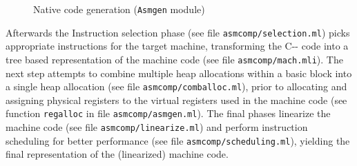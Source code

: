 \documentclass[10pt,a4paper,final,twocolumn]{article}
\begin{document}
\begin{figure}[htb]
  \centering
  \caption{Native code generation (\texttt{Asmgen} module)}
  \label{fig:Native_code_generation}
\end{figure}

Afterwards the Instruction selection phase (see file \texttt{asmcomp/selection.ml}) picks appropriate
instructions for the target machine, transforming the C\mbox{-}\mbox{-} code into a tree based representation
of the machine code (see file \texttt{asmcomp/mach.mli}). The next step attempts to combine multiple heap
allocations within a basic block into a single heap allocation (see file \texttt{asmcomp/comballoc.ml}),
prior to allocating and assigning physical registers to the virtual registers used in the machine code
(see function \texttt{regalloc} in file \texttt{asmcomp/asmgen.ml}).
The final phases linearize the machine code (see file \texttt{asmcomp/linearize.ml}) and perform
instruction scheduling for better performance (see file \texttt{asmcomp/scheduling.ml}), yielding the
final representation of the (linearized) machine code.
\end{document}
